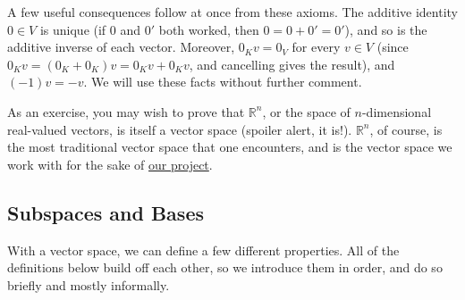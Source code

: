\documentclass{article}
\begin{document}
A few useful consequences follow at once from these axioms. The additive identity $0 \in V$ is unique (if $0$ and $0'$ both worked, then $0 = 0 + 0' = 0'$), and so is the additive inverse of each vector. Moreover, $0_K v = 0_V$ for every $v \in V$ (since $0_K v = (0_K + 0_K)v = 0_K v + 0_K v$, and cancelling gives the result), and $(-1)v = -v$. We will use these facts without further comment.

As an exercise, you may wish to prove that $\mathbb{R}^n$, or the space of $n$-dimensional real-valued vectors, is itself a vector space (spoiler alert, it is!). $\mathbb{R}^n$, of course, is the most traditional vector space that one encounters, and is the vector space we work with for the sake of \href{https://github.com/jeanjacquesstleroux/2manifold-brownian-motion}{our project}.

\subsection{Subspaces and Bases}
With a vector space, we can define a few different properties. All of the definitions below build off each other, so we introduce them in order, and do so briefly and mostly informally.
\end{document}
